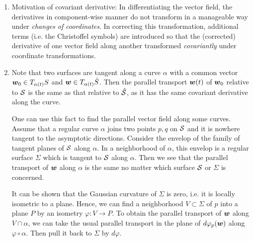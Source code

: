 \documentclass[11pt]{article}
\begin{document}
\begin{enumerate}
\item Motivation of covariant derivative: In differentiating the vector field, the derivatives in component-wise manner do not transform in a manageable way under \emph{changes of coordinates}. In correcting this transformation, additional terms (i.e. the Christoffel symbols) are introduced so that the (corrected) derivative of one vector field along another transformed \emph{covariantly} under coordinate transformations. 

\item  \begin{remark}
Note that two surfaces are tangent along a curve $\alpha$ with a common vector $\boldsymbol{w}_{0} \in T_{\alpha(t)}S$ and $\boldsymbol{w} \in T_{\alpha(t)}\hat{S}$. Then the parallel transport $\boldsymbol{w}(t)$ of $\boldsymbol{w}_{0}$ relative to ${\mathcal S}$ is the same as that relative to $\hat{{\mathcal S}}$, as it has the same covariant derivative along the curve.

One can use this fact to find the parallel vector field along some curves. Assume that a regular curve $\alpha$ joins two points $p,q$ on ${\mathcal S}$ and it is nowhere tangent to the asymptotic directions. Consider the envelop of the family of tangent planes of ${\mathcal S}$ along $\alpha$. In a neighborhood of $\alpha$, this envelop is a regular surface $\Sigma$ which is tangent to ${\mathcal S}$ along $\alpha$. Then we see that the parallel transport of $\boldsymbol{w}$ along $\alpha$ is the same no matter which surface ${\mathcal S}$ or $\Sigma$ is concerned. 

 It can be shown that the Gaussian curvature of $\Sigma$ is zero, i.e. it is locally isometric to a plane. Hence, we can find a neighborhood $V\subset \Sigma$ of $p$ into a plane $P$ by an isometry $\varphi: V\rightarrow P$. To obtain the parallel transport of $\boldsymbol{w}$ along $V\cap \alpha$, we can take the usual parallel transport in the plane of $d\varphi_{p}(\boldsymbol{w})$ along $\varphi\circ  \alpha$. Then pull it back to $\Sigma$ by $d\varphi$.\\[10pt]
 \end{remark}


\end{enumerate}
\end{document}
